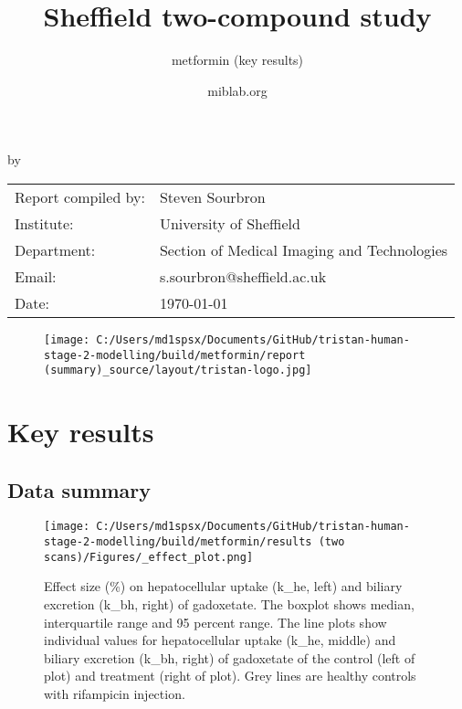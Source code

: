 \documentclass{epflreport}%
\begin{document}
%
\normalsize%
\frontmatter%
\title{Sheffield two{-}compound study}%
\subtitle{metformin (key results)}%
\author{miblab.org}%
\subject{D2.13 {-} Internal report}%
%
%
%
\makecover%
\begin{titlepage}%
\begin{center}%
\makeatletter%
\largetitlestyle\fontsize{45}{45}\selectfont\@title%
\makeatother%
\linebreak%
\makeatletter%
\ifdefvoid{\@subtitle}{}{\bigskip\titlestyle\fontsize{20}{20}\selectfont\@subtitle}%
\makeatother%
\linebreak%
\bigskip%
\bigskip%
by%
\linebreak%
\bigskip%
\bigskip%
\makeatletter%
\largetitlestyle\fontsize{25}{25}\selectfont\@author%
\makeatother%
\vfill%
\large%
\begin{tabular}{ll}%
\hline%
Report compiled by: &Steven Sourbron\\%
Institute: &University of Sheffield\\%
Department: &Section of Medical Imaging and Technologies\\%
Email: &s.sourbron@sheffield.ac.uk\\%
Date: &\today\\%
\hline%
\end{tabular}%


\begin{figure}[b!]%
\centering%
\centering%
\texttt{[image: C:/Users/md1spsx/Documents/GitHub/tristan-human-stage-2-modelling/build/metformin/report (summary)\_source/layout/tristan-logo.jpg]}%
\end{figure}

%
\end{center}%
\end{titlepage}%
\newpage%
\tableofcontents%
\mainmatter%
\clearpage%
\chapter{Key results}%
\section{Data summary}%
\label{sec:Datasummary}%

%


\begin{figure}[h!]%
\centering%
\texttt{[image: C:/Users/md1spsx/Documents/GitHub/tristan-human-stage-2-modelling/build/metformin/results (two scans)/Figures/\_effect\_plot.png]}%
\caption{Effect size (\%) on hepatocellular uptake (k\_he, left) and biliary excretion (k\_bh, right) of gadoxetate. The boxplot shows median, interquartile range and 95 percent range. The line plots show individual values for hepatocellular uptake (k\_he, middle) and biliary excretion (k\_bh, right) of gadoxetate of the control (left of plot) and treatment (right of plot). Grey lines are healthy controls with rifampicin injection.}%
\end{figure}
\end{document}
